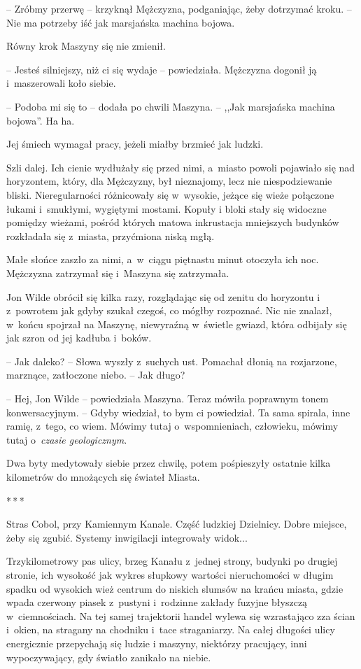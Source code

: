 \documentclass[oneside,polish,11pt,sfheadings]{mwbk}
\newcommand{\threeast}{\bigskip\par\centerline{*\,*\,*}\medskip\par}
\begin{document}
-- Zróbmy przerwę -- krzyknął Mężczyzna, podganiając, żeby dotrzymać
kroku. -- Nie ma potrzeby iść jak marsjańska machina bojowa.

Równy krok Maszyny się nie zmienił.

-- Jesteś silniejszy, niż ci się wydaje -- powiedziała. Mężczyzna dogonił
ją i~maszerowali koło siebie.

-- Podoba mi się to -- dodała po chwili Maszyna. -- ,,Jak marsjańska machina
bojowa''. Ha ha.

Jej śmiech wymagał pracy, jeżeli miałby brzmieć jak ludzki.

Szli dalej. Ich cienie wydłużały się przed nimi, a~miasto powoli
pojawiało się nad horyzontem, który, dla Mężczyzny, był nieznajomy, lecz
nie niespodziewanie bliski. Nieregularności różnicowały się w~wysokie,
jeżące się wieże połączone łukami i~smukłymi, wygiętymi mostami. Kopuły
i bloki stały się widoczne pomiędzy wieżami, pośród których matowa
inkrustacja mniejszych budynków rozkładała się z~miasta, przyćmiona
niską mgłą.

Małe słońce zaszło za nimi, a~w~ciągu piętnastu minut otoczyła ich noc.
Mężczyzna zatrzymał się i~Maszyna się zatrzymała.

Jon Wilde obrócił się kilka razy, rozglądając się od zenitu do horyzontu
i z~powrotem jak gdyby szukał czegoś, co mógłby rozpoznać. Nic nie
znalazł, w~końcu spojrzał na Maszynę, niewyraźną w~świetle gwiazd, która
odbijały się jak szron od jej kadłuba i~boków.

-- Jak daleko? -- Słowa wyszły z~suchych ust. Pomachał dłonią na
rozjarzone, marznące, zatłoczone niebo. -- Jak długo?

-- Hej, Jon Wilde -- powiedziała Maszyna. Teraz mówiła poprawnym tonem
konwersacyjnym. -- Gdyby wiedział, to bym ci powiedział. Ta sama spirala,
inne ramię, z~tego, co wiem. Mówimy tutaj o~wspomnieniach, człowieku,
mówimy tutaj o~\emph{czasie geologicznym}.

Dwa byty medytowały siebie przez chwilę, potem pośpieszyły ostatnie
kilka kilometrów do mnożących się świateł Miasta.

\threeast

Stras Cobol, przy Kamiennym Kanale. Część ludzkiej Dzielnicy. Dobre
miejsce, żeby się zgubić. Systemy inwigilacji integrowały widok...

Trzykilometrowy pas ulicy, brzeg Kanału z~jednej strony, budynki po
drugiej stronie, ich wysokość jak wykres słupkowy wartości nieruchomości
w długim spadku od wysokich wież centrum do niskich slumsów na krańcu
miasta, gdzie wpada czerwony piasek z~pustyni i~rodzinne zakłady fuzyjne
błyszczą w~ciemnościach. Na tej samej trajektorii handel wylewa się
wzrastająco zza ścian i~okien, na stragany na chodniku i~tace
straganiarzy. Na całej długości ulicy energicznie przepychają się ludzie
i maszyny, niektórzy pracujący, inni wypoczywający, gdy światło zanikało
na niebie.
\end{document}
